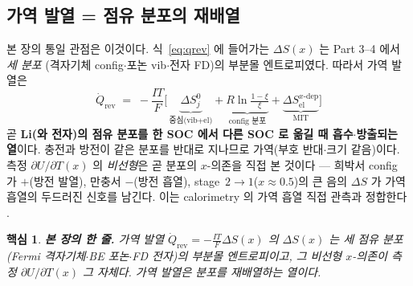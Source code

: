 \documentclass[11pt,a4paper]{article}
\newtheorem*{keybox}{핵심}
\newcommand{\rev}{\mathrm{rev}}
\newcommand{\elc}{\mathrm{el}}
\begin{document}
\subsection{가역 발열 = 점유 분포의 재배열}\label{sec:rearrange}
본 장의 통일 관점은 이것이다. 식~\eqref{eq:qrev} 에 들어가는 $\Delta S(x)$ 는 Part 3--4 에서 \emph{세 분포}
(격자기체 config$\cdot$포논 vib$\cdot$전자 FD)의 부분몰 엔트로피였다. 따라서 가역 발열은
\[
\boxed{\;
\dot Q_\rev \;=\; -\frac{IT}{F}\Big[\,\underbrace{\Delta S^0_j}_{\text{중심(vib+el)}}
          +\underbrace{R\ln\tfrac{1-\xi}{\xi}}_{\text{config 분포}}
          +\underbrace{\Delta S_\elc^{x\text{-dep}}}_{\text{MIT}}\Big]
\;}
\]
곧 \textbf{Li(와 전자)의 점유 분포를 한 SOC 에서 다른 SOC 로 옮길 때 흡수$\cdot$방출되는 열}이다. 충전과
방전이 같은 분포를 반대로 지나므로 가역(부호 반대$\cdot$크기 같음)이다. 측정 $\partial U/\partial T(x)$ 의
\emph{비선형}은 곧 분포의 $x$-의존을 직접 본 것이다 — 희박서 config 가 $+$(방전 발열), 만충서 $-$(방전
흡열), stage~$2\to1$($x\approx0.5$)의 큰 음의 $\Delta S$ 가 가역 흡열의 두드러진 신호를 남긴다. 이는
calorimetry 의 가역 흡열 직접 관측과 정합한다 \cite{reynier2003,standardised2024}.

\begin{keybox}
\textbf{본 장의 한 줄.} 가역 발열 $\dot Q_\rev=-\tfrac{IT}{F}\Delta S(x)$ 의 $\Delta S(x)$ 는 \emph{세 점유
분포}(Fermi 격자기체$\cdot$BE 포논$\cdot$FD 전자)의 부분몰 엔트로피이고, 그 비선형 $x$-의존이 측정
$\partial U/\partial T(x)$ 그 자체다. 가역 발열은 \emph{분포를 재배열하는 열}이다.
\end{keybox}
\end{document}
